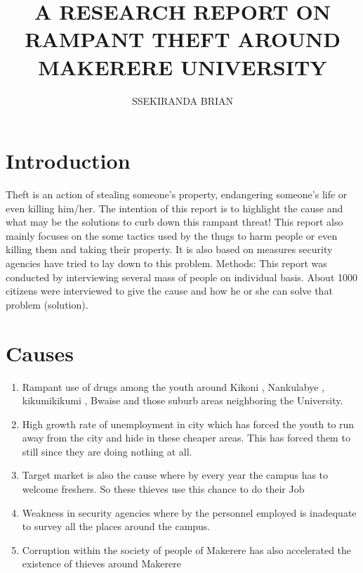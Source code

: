 \documentclass{article}
\begin{document}
\title{A RESEARCH REPORT ON RAMPANT THEFT AROUND MAKERERE UNIVERSITY}
\author{SSEKIRANDA BRIAN }
\maketitle
\section{Introduction}
Theft is an action of stealing someone’s property, endangering someone’s life or even killing him/her. The intention of this report is to highlight the cause and what may be the solutions to curb down this rampant threat!
This report also mainly focuses on the some tactics used by the thugs to harm people or even killing them and taking their property. It is also based on measures security agencies have tried to lay down to this problem.
Methods:
This report was conducted by interviewing several mass of people on individual basis. About 1000 citizens were interviewed to give the cause and how he or she can solve that problem (solution).

\section{Causes}
\begin{enumerate}
\item Rampant use of drugs among the youth around Kikoni , Nankulabye , kikumikikumi , Bwaise and those suburb areas neighboring the University.
\item High growth rate of unemployment in city which has forced the youth to run away from the city and hide in these cheaper areas. This has forced them to still since they are doing nothing at all.
\item Target market is also the cause where by every year the campus has to welcome freshers. So these thieves use this chance to do their Job
\item Weakness in security agencies where by the personnel employed is inadequate to survey all the places around the campus.
\item Corruption within the society of people of Makerere has also accelerated the existence of thieves around Makerere
\end{enumerate}
\end{document}
